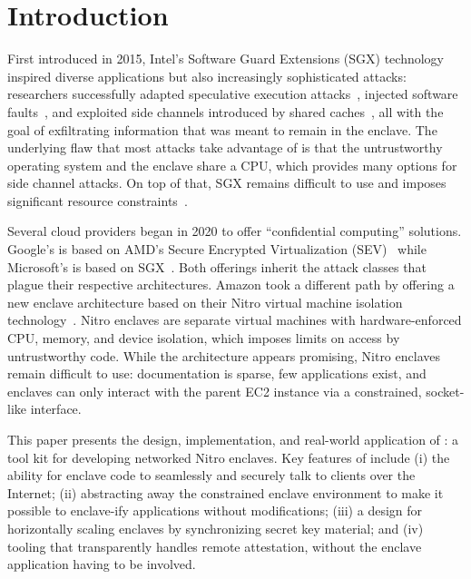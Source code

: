 \section{Introduction}

First introduced in 2015, Intel's Software Guard Extensions (SGX) technology
inspired diverse applications but also increasingly sophisticated attacks:
researchers successfully adapted speculative execution
attacks~\cite{VanBulck2018a}, injected software faults~\cite{Murdock2020a}, and
exploited side channels introduced by shared caches~\cite{Brasser2017a}, all
with the goal of exfiltrating information that was meant to remain in the
enclave.  The underlying flaw that most attacks take advantage of is that the
untrustworthy operating system and the enclave share a CPU, which provides many
options for side channel attacks.  On top of that, SGX remains difficult to use
and imposes significant resource constraints~\cite{Ngoc2019a}.

Several cloud providers began in 2020 to offer ``confidential computing''
solutions.  Google's is based on AMD's Secure Encrypted Virtualization
(SEV)~\cite{googlecc} while Microsoft's is based on SGX~\cite{azurecc}.  Both
offerings inherit the attack classes that plague their respective architectures.
Amazon took a different path by offering a new enclave architecture based on
their Nitro virtual machine isolation technology~\cite{nitro-enclaves}.  Nitro
enclaves are separate virtual machines with hardware-enforced CPU, memory, and
device isolation, which imposes limits on access by untrustworthy code.  While
the architecture appears promising, Nitro enclaves remain difficult to use:
documentation is sparse, few applications exist, and enclaves can only interact
with the parent EC2 instance via a constrained, socket-like interface.

This paper presents the design, implementation, and real-world application of
\tool{}: a tool kit for developing networked Nitro enclaves.  Key features of
\tool{} include
(i) the ability for enclave code to seamlessly and securely talk to clients over
the Internet;
(ii) abstracting away the constrained enclave environment to make it possible to
enclave-ify applications without modifications;
(iii) a design for horizontally scaling enclaves by synchronizing secret key
material; and
(iv) tooling that transparently handles remote attestation, without the enclave
application having to be involved.

